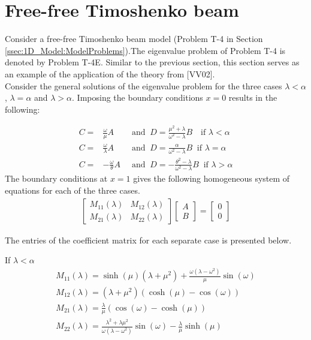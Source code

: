 \documentclass[../../main.tex]{subfiles}
\begin{document}
\section{Free-free Timoshenko beam}\label{sec:Timo:Free}
Consider a free-free Timoshenko beam model (Problem T-4 in Section \ref{ssec:1D_Model:ModelProblems}).The eigenvalue problem of Problem T-4 is denoted by Problem T-4E. Similar to the previous section, this section serves as an example of the application of the theory from [VV02].\\

Consider the general solutions of the eigenvalue problem for the three cases $\lambda < \alpha$, $\lambda = \alpha$ and $\lambda > \alpha$. Imposing the boundary conditions $x = 0$ results in the following:

\begin{align}
	C  =&  \frac{\omega}{\mu}A &\textrm{ and } \ D = \frac{ \mu^2+\lambda}{\omega^2-\lambda}B \ \ \ \textrm{ if } \lambda < \alpha \label{A1}\\
	C = & \frac{\omega}{\lambda}A \ &\textrm{ and } \ D = \frac{\alpha}{\omega^2-\lambda}B  \ \textrm{ if } \lambda = \alpha \label{A2}\\
	C= &-\frac{\omega}{\theta}A \ &\textrm{ and } \ D = -\frac{\theta^2-\lambda}{\omega^2 - \lambda}B  \ \textrm{ if } \lambda > \alpha \label{A3}
\end{align}
The boundary conditions at $x = 1$ gives the following homogeneous system of equations for each of the three cases.
\begin{align}
	\begin{bmatrix}
		M_{11}(\lambda) & M_{12}(\lambda)\\
		M_{21}(\lambda) & M_{22}(\lambda)
	\end{bmatrix}
	\begin{bmatrix}
		A\\
		B
	\end{bmatrix}
	= 
	\begin{bmatrix}
		0\\
		0
	\end{bmatrix}
	\label{eq:Timo:Free:SystemOfEquations}
\end{align}

The entries of the coefficient matrix for each separate case is presented below.

{If $\lambda < \alpha$}
\begin{align*}
	&M_{11}(\lambda) = \sinh(\mu)(\lambda+\mu^2) + \frac{\omega(\lambda - \omega^2)}{\mu}\sin(\omega)&\\
	&M_{12}(\lambda) = (\lambda+\mu^2)(\cosh(\mu)-\cos(\omega))& \\
	&M_{21}(\lambda) = \frac{\lambda}{\mu}(\cos(\omega) - \cosh(\mu))&\\
	&M_{22}(\lambda) =\frac{\lambda^2+\lambda\mu^2}{\omega(\lambda-\omega^2)}\sin(\omega) - \frac{\lambda }{\mu}\sinh(\mu)&
\end{align*}
\end{document}
